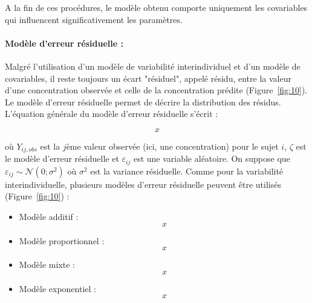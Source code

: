 A la fin de ces procédures, le modèle obtenu comporte uniquement les covariables qui influencent significativement les paramètres.

\paragraph*{Modèle d'erreur résiduelle :} Malgré l'utilisation d'un modèle de variabilité interindividuel et d'un modèle de covariables, il reste toujours un écart "résiduel", appelé résidu, entre la valeur d'une concentration observée et celle de la concentration prédite (Figure~\ref{fig:10}). Le modèle d'erreur résiduelle permet de décrire la distribution des résidus. L'équation générale du modèle d'erreur résiduelle s'écrit :

\begin{equation}
x
\label{eq:49}
\end{equation}

où $Y_{ij,obs}$ est la $j$ème valeur observée (ici, une concentration) pour le sujet $i$, $\zeta$ est le modèle d'erreur résiduelle et $\varepsilon_{ij}$ est une variable aléatoire. On suppose que $\varepsilon_{ij} \sim \mathcal{N}(0 ; \sigma^2)$ où $\sigma^2$ est la variance résiduelle. Comme pour la variabilité interindividuelle, plusieurs modèles d'erreur résiduelle peuvent être utilisés (Figure~\ref{fig:10}) :
\begin{itemize}
\item Modèle additif :
\begin{equation}
x
\label{eq:50}
\end{equation}

\item Modèle proportionnel :
\begin{equation}
x
\label{eq:51}
\end{equation}

\item Modèle mixte :
\begin{equation}
x
\label{eq:52}
\end{equation}

\item Modèle exponentiel :
\begin{equation}
x
\label{eq:53}
\end{equation}

\end{itemize}

